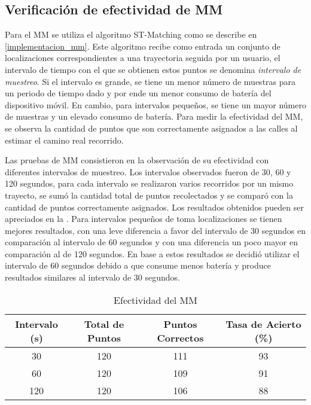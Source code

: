 \subsection{Verificación de efectividad de MM}

Para el MM se utiliza el algoritmo ST-Matching como se describe en \cref{implementacion_mm}. Este algoritmo recibe como entrada un conjunto de localizaciones correspondientes a una trayectoria seguida por un usuario, el intervalo de tiempo con el que se obtienen estos puntos se denomina \emph{intervalo de muestreo}. Si el intervalo es grande, se tiene un menor número de muestras para un periodo de tiempo dado y por ende un menor consumo de batería del dispositivo móvil. En cambio, para intervalos pequeños, se tiene un mayor número de muestras y un elevado consumo de batería. Para medir la efectividad del MM, se observa la cantidad de puntos que son correctamente asignados a las calles al estimar el camino real recorrido.

Las pruebas de MM consistieron en la observación de su efectividad con diferentes intervalos de muestreo. Los intervalos observados fueron de 30, 60 y 120 segundos, para cada intervalo se realizaron varios recorridos por un mismo trayecto, se sumó la cantidad total de puntos recolectados y se comparó con la cantidad de puntos correctamente asignados. Los resultados obtenidos pueden ser apreciados en la . Para intervalos pequeños de toma localizaciones se tienen mejores resultados, con una leve diferencia a favor del intervalo de 30 segundos en comparación al intervalo de 60 segundos y con una diferencia un poco mayor en comparación al de 120 segundos. En base a estos resultados se decidió utilizar el intervalo de 60 segundos debido a que consume menos batería y produce resultados similares al intervalo de 30 segundos.

\begin{table}[h]
	\centering
	\begin{tabular}{cccc}
        \toprule
    	Intervalo (s) & Total de Puntos & Puntos Correctos & Tasa de Acierto (\%)\\
    	\midrule
    	30 & 120  & 111 & 93 \\
    	60 & 120 & 109 & 91 \\
    	120 & 120 & 106 & 88 \\ 
    	\bottomrule
	\end{tabular}
	\caption{Efectividad del MM} 
	\label{table:map_matching}
\end{table}

